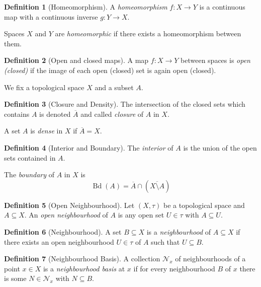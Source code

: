 \documentclass[11pt,a4paper]{article}
\theoremstyle{definition}
\newtheorem{definition}{Definition}[section]
\theoremstyle{plain}
\theoremstyle{remark}
\begin{document}
\begin{definition}[Homeomorphism]
  A \emph{homeomorphism} $f \colon X \to Y$ is a continuous map with a continuous inverse 
  $g \colon Y \to X$. 

  Spaces $X$ and $Y$ are \emph{homeomorphic} if there exists a homeomorphism between them. 
\end{definition}

\begin{definition}[Open and closed maps]
  A map $f \colon X \to Y$ between spaces is \emph{open (closed)} if the image of each open (closed) set is again open (closed).
\end{definition}

We fix a topological space $X$ and a subset $A$. 
\begin{definition}[Closure and Density]
  The intersection of the closed sets which contains $A$ is denoted $\overline{A}$ 
  and called \emph{closure} of $A$ in $X$. 

  A set $A$ is \emph{dense} in $X$ if $\overline{A} = X$. 
\end{definition}

\begin{definition}[Interior and Boundary]
  The \emph{interior} of $A$ is the union of the open sets contained in $A$. 

  The \emph{boundary} of $A$ in $X$ is 
  $$\operatorname{Bd}(A) = \overline{A} \cap \left(\overline{X \setminus A}\right)$$
\end{definition}

\begin{definition}[Open Neighbourhood]
Let \((X,\tau)\) be a topological space and \(A\subseteq X\).  An \emph{open neighbourhood} of \(A\) is any open set \(U\in\tau\) with \(A\subseteq U\).
\end{definition}

\begin{definition}[Neighbourhood]
A set \(B\subseteq X\) is a \emph{neighbourhood} of \(A\subseteq X\) if there exists an open neighbourhood \(U\in\tau\) of \(A\) such that \(U\subseteq B\).
\end{definition}

\begin{definition}[Neighbourhood Basis]
A collection \(\mathcal N_x\) of neighbourhoods of a point \(x\in X\) is a \emph{neighbourhood basis} at \(x\) if for every neighbourhood \(B\) of \(x\) there is some \(N\in\mathcal N_x\) with \(N\subseteq B\).
\end{definition}
\end{document}
